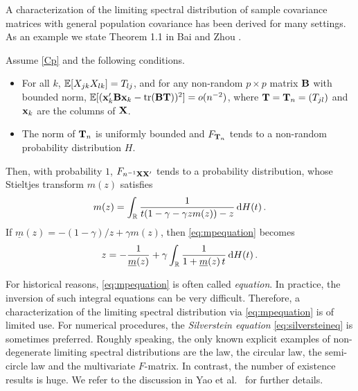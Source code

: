 A characterization of the limiting spectral distribution of sample covariance matrices with  general population covariance has been derived for many settings. As an example we state Theorem 1.1 in Bai and Zhou \cite{bai:zhou:2008}.
\begin{theorem}\label{them:baizhou}
Assume \eqref{Cp} and the following conditions.
\begin{itemize}
\item For all $k$, $\mathbb{E}[X_{jk}X_{lk}]=T_{lj}$, and for any non-random $p\times p$ matrix ${\mathbf B}$ with bounded norm, $\mathbb{E}[({\mathbf x}_k'{\mathbf B} {\mathbf x}_k -\operatorname{tr}({\mathbf B} {\mathbf T}))^2]=o(n^{-2})$, where ${\mathbf T}={\mathbf T}_n=(T_{jl})$ and ${\mathbf x}_k$ are the columns of ${\mathbf X}$.
\item The norm of ${\mathbf T}_n$ is uniformly bounded and $F_{{\mathbf T}_n}$ tends to a non-random probability distribution $H$.
\end{itemize}
Then, with probability $1$, $F_{n^{-1}{\mathbf X}{\mathbf X}'}$ tends to a probability distribution, whose Stieltjes transform $m(z)$ satisfies
\begin{equation}\label{eq:mpequation}
m(z)=\int_{\mathbb{R}} \frac{1}{t(1-\gamma-\gamma z m(z))-z} \,\mathrm{d} H(t)\,.
\end{equation}
If $\underline{m}(z)=-(1-\gamma)/z+\gamma m(z)$, then \eqref{eq:mpequation} becomes
\begin{equation}\label{eq:silversteineq}
z=-\frac{1}{\underline{m}(z)}+\gamma \int_{\mathbb{R}} \frac{1}{1+\underline{m}(z) \,t} \,\mathrm{d} H(t)\,.
\end{equation}
\end{theorem}
For historical reasons, \eqref{eq:mpequation} is often called {\em \MP equation}. In practice, the inversion of such integral equations can be very difficult. Therefore, a characterization of the limiting spectral distribution via \eqref{eq:mpequation} is of limited use. For numerical procedures, the {\em Silverstein equation} \eqref{eq:silversteineq} is sometimes preferred. 
Roughly speaking, the only known explicit examples of non-degenerate limiting spectral distributions are the \MP law, the circular law, the semi-circle law and the multivariate $F$-matrix. In contrast, the number of existence results is huge. 
We refer to the discussion in Yao et al.~\cite{yao:zheng:bai:2015} for further details.
\medskip

